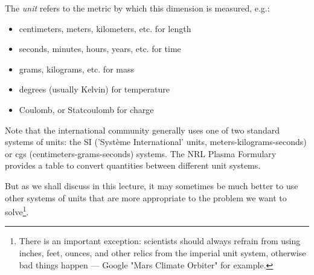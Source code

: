 The {\it unit} refers to the metric by which this dimension is measured, e.g.:
\begin{itemize}
    \item centimeters, meters,  kilometers, etc. for length
    \item seconds, minutes, hours,  years, etc. for time 
    \item grams, kilograms, etc. for mass
    \item degrees (usually Kelvin) for temperature
    \item Coulomb, or Statcoulomb for charge
\end{itemize}
Note that the international community generally uses one of two standard systems of units: the SI  ('Syst\`eme International' units, meters-kilograms-seconds) or cgs (centimeters-grams-seconds) systems. The NRL Plasma Formulary provides a table to convert quantities between different unit systems. 

But as we shall discuss in this lecture, it may sometimes be much better to use other systems of units that are more appropriate to the problem we want to solve\footnote{There is an important exception: scientists should always refrain from using inches, feet, ounces, and other relics from the imperial unit system, otherwise bad things happen --- Google "Mars Climate Orbiter" for example.}. 

